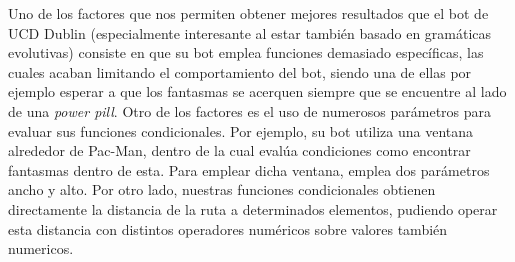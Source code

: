 Uno de los factores que nos permiten obtener mejores resultados que el bot\cite{galvan2010evolving} de UCD Dublin (especialmente interesante al estar también basado en gramáticas evolutivas) consiste en que su bot emplea funciones demasiado específicas, las cuales acaban limitando el comportamiento del bot, siendo una de ellas por ejemplo esperar a que los fantasmas se acerquen siempre que se encuentre al lado de una \textit{power pill}. 
Otro de los factores es el uso de numerosos parámetros para evaluar sus funciones condicionales. Por ejemplo, su bot utiliza una ventana alrededor de Pac-Man, dentro de la cual evalúa condiciones como encontrar fantasmas dentro de esta. Para emplear dicha ventana, emplea dos parámetros ancho y alto. Por otro lado, nuestras funciones condicionales obtienen directamente la distancia de la ruta a determinados elementos, pudiendo operar esta distancia con distintos operadores numéricos sobre valores también numericos.
